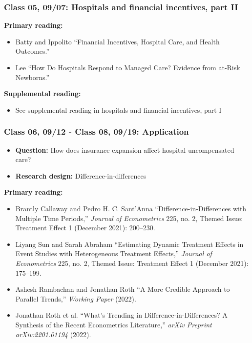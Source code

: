 \documentclass[11pt,]{article}
\providecommand{\tightlist}{%
  \setlength{\itemsep}{0pt}\setlength{\parskip}{0pt}}
\begin{document}
\hypertarget{class-05-0907-hospitals-and-financial-incentives-part-ii}{%
\subsubsection{Class 05, 09/07: Hospitals and financial incentives, part
II}\label{class-05-0907-hospitals-and-financial-incentives-part-ii}}

\textbf{Primary reading:}

\begin{itemize}
\tightlist
\item
  Batty and Ippolito {``Financial Incentives, Hospital Care, and Health
  Outcomes.''}
\item
  Lee {``How Do Hospitals Respond to Managed Care? {Evidence} from
  at-Risk Newborns.''}
\end{itemize}

\textbf{Supplemental reading:}

\begin{itemize}
\tightlist
\item
  See supplemental reading in hospitals and financial incentives, part I
\end{itemize}

\hypertarget{class-06-0912---class-08-0919-application}{%
\subsubsection{Class 06, 09/12 - Class 08, 09/19:
Application}\label{class-06-0912---class-08-0919-application}}

\begin{itemize}
\tightlist
\item
  \textbf{Question:} How does insurance expansion affect hospital
  uncompensated care?
\item
  \textbf{Research design:} Difference-in-differences
\end{itemize}

\textbf{Primary reading:}

\begin{itemize}
\tightlist
\item
  Brantly Callaway and Pedro H. C. Sant'Anna
  {``Difference-in-{Differences} with Multiple Time Periods,''}
  \emph{Journal of Econometrics} 225, no. 2, Themed {Issue}: {Treatment}
  {Effect} 1 (December 2021): 200--230.
\item
  Liyang Sun and Sarah Abraham {``Estimating Dynamic Treatment Effects
  in Event Studies with Heterogeneous Treatment Effects,''}
  \emph{Journal of Econometrics} 225, no. 2, Themed {Issue}: {Treatment}
  {Effect} 1 (December 2021): 175--199.
\item
  Ashesh Rambachan and Jonathan Roth {``A {More} {Credible} {Approach}
  to {Parallel} {Trends},''} \emph{Working Paper} (2022).
\item
  Jonathan Roth et al. {``What's {Trending} in
  {Difference}-in-{Differences}? {A} {Synthesis} of the {Recent}
  {Econometrics} {Literature},''} \emph{arXiv Preprint arXiv:2201.01194}
  (2022).
\end{itemize}
\end{document}
